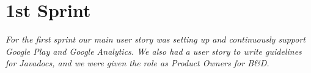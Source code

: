 \chapter{1st Sprint} \label{ChapSprint1}
\textit{For the first sprint our main user story was setting up and continuously support Google Play and Google Analytics. We also had a user story to write guidelines for Javadocs, and we were given the role as Product Owners for B\&D.}




